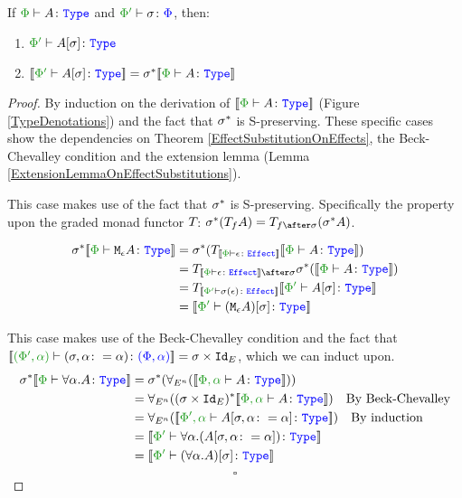 \documentclass{Report}
\begin{document}
\begin{framed}
    \begin{theorem}\label{EffectSubstitutionOnTypes}
       If $\wellformedtype{\P}{A}$ and $\typerelation{\P'}{\si}{\P}$, then:
       \begin{enumerate}[label=\roman*.]
           \item $\wellformedtype{\P'}{A\ssi}$
           \item $\deno{\wellformedtype{\P'}{A\ssi}} = \si\star\deno{\wellformedtype{\P}{A}}$
       \end{enumerate}
    \end{theorem}
    
    \begin{proof}
       By induction on the derivation of $\deno{\wellformedtype{\P}{A}}$ (Figure \ref{TypeDenotations}) and the fact that $\sigma^*$ is S-preserving. These specific cases show the dependencies on Theorem \ref{EffectSubstitutionOnEffects}, the Beck-Chevalley condition and the extension lemma (Lemma \ref{ExtensionLemmaOnEffectSubstitutions}).
    
        \case{\teffect}
        This case makes use of the fact that $\sigma^*$ is S-preserving. Specifically the property upon the graded monad functor $T_{}{}$: $\si\star(\T{f}{A}) = \T{f\after\si}{(\si\star A)}$.
    
    
        \begin{align*}
            \si\star\deno{\typerelation{\P}{\mea}{\type}} & =  \si\star(\T{\deno{\typerelation{\P}{\e}{\effect}}}{\deno{\typerelation{\P}{A}{\type}}})\\
            &= \T{\deno{\typerelation{\P}{\e}{\effect}}\after\si}{\si\star(\deno{\typerelation{\P}{A}{\type}})}\\
            & = \T{\deno{\wellformedeffect{\P'}{\si(\e)}}}{\deno{\wellformedtype{\P'}{A\ssi}}}\\
            & = \deno{\typerelation{\P'}{(\mea)\ssi}{\type}}
        \end{align*}
        
        \case{\tquant}
        This case makes use of the Beck-Chevalley condition and the fact that $\deno{\typerelation{(\P', \a)}{(\si, \a\setto\a)}{(\P, \a)}} = \si\times\Id{E}$, which we can induct upon.
            \begin{align*}
                \si\star\deno{\typerelation{\P}{\all{\a}A}{\type}} & = \si\star(\allEn(\deno{\typerelation{\P,\a}{A}{\type}}))\\
                & = \allEn((\si\times\Id{E})\star\deno{\typerelation{\P,\a}{A}{\type}})\qt{By Beck-Chevalley}\\
                & = \allEn(\deno{\typerelation{\P',\a}{A\sub{\si, \a\setto\a}}{\type}})\qt{By induction}\\
                & = \deno{\typerelation{\P'}{\all{\a}{(A\sub{\si, \a\setto\a})}}{\type}}\\
                & = \deno{\typerelation{\P'}{(\all{\a}{A})\ssi}{\type}}\\
            \end{align*}
            $$\square$$
    \end{proof}
\end{framed}
\end{document}

